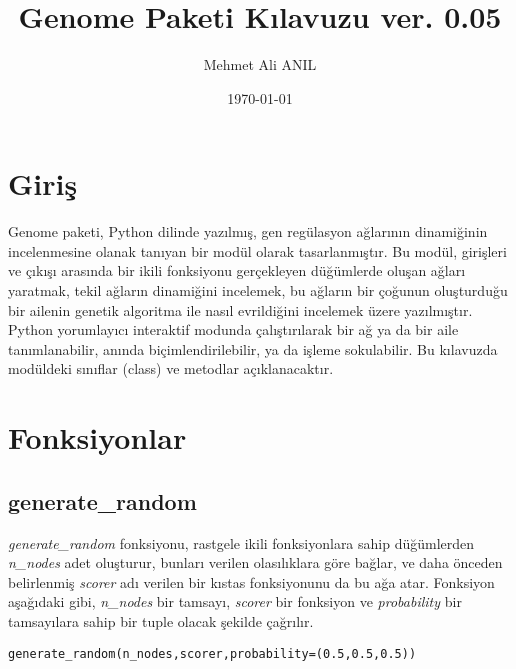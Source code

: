 

\title{Genome Paketi Kılavuzu ver. 0.05}
\author{Mehmet Ali ANIL}
\date{\today}





\shorthandoff{=}
\maketitle

\tableofcontents

\section{Giriş}

Genome paketi, Python dilinde yazılmış, gen regülasyon ağlarının dinamiğinin incelenmesine olanak tanıyan bir modül olarak tasarlanmıştır. Bu modül, girişleri ve çıkışı arasında bir ikili fonksiyonu gerçekleyen düğümlerde oluşan ağları yaratmak, tekil ağların dinamiğini incelemek, bu ağların bir çoğunun oluşturduğu bir ailenin genetik algoritma ile nasıl evrildiğini incelemek üzere yazılmıştır. Python yorumlayıcı interaktif modunda çalıştırılarak bir ağ ya da bir aile tanımlanabilir, anında biçimlendirilebilir, ya da işleme sokulabilir. Bu kılavuzda modüldeki sınıflar (class) ve metodlar açıklanacaktır. 

\section{Fonksiyonlar}
\subsection{generate\_random}

\emph{generate\_random} fonksiyonu, rastgele ikili fonksiyonlara sahip düğümlerden \emph{n\_nodes} adet oluşturur, bunları verilen olasılıklara göre bağlar, ve daha önceden belirlenmiş \emph{scorer} adı verilen  bir kıstas fonksiyonunu da bu ağa atar. Fonksiyon aşağıdaki gibi, \emph{n\_nodes} bir tamsayı, \emph{scorer} bir fonksiyon ve \emph{probability} bir tamsayılara sahip bir tuple olacak şekilde çağrılır. 

\label{code_generate_random}
\begin{lstlisting}
generate_random(n_nodes,scorer,probability=(0.5,0.5,0.5))
\end{lstlisting}

